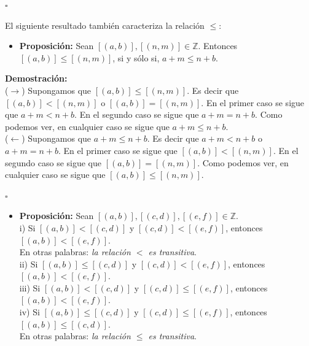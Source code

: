 \documentclass[10 pt]{article}
\begin{document}
\begin{flushright}
    $\square$
\end{flushright}

\Large{El siguiente resultado también caracteriza la relación $\leq$:} \\

\begin{itemize}
    \item \Large{\textbf{Proposición:} Sean $[(a,b)],[(n,m)] \in \mathbb Z$. Entonces $[(a,b)] \leq [(n,m)]$, si y sólo si, $a+m \leq n+b$.} \\
\end{itemize}

\Large{\textbf{Demostración:} \\

($\rightarrow$) Supongamos que $[(a,b)] \leq [(n,m)]$. Es decir que $[(a,b)]<[(n,m)]$ o $[(a,b)]=[(n,m)]$. En el primer caso se sigue que $a+m<n+b$. En el segundo caso se sigue que $a+m=n+b$. Como podemos ver, en cualquier caso se sigue que $a+m \leq n+b$. \\

($\leftarrow$) Supongamos que $a+m \leq n+b$. Es decir que $a+m<n+b$ o $a+m=n+b$. En el primer caso se sigue que $[(a,b)]<[(n,m)]$. En el segundo caso se sigue que $[(a,b)]=[(n,m)]$. Como podemos ver, en cualquier caso se sigue que $[(a,b)] \leq [(n,m)]$.} \\

\begin{flushright}
    $\square$
\end{flushright}

\begin{itemize}
    \item \Large{\textbf{Proposición:} Sean $[(a,b)],[(c,d)],[(e,f)] \in \mathbb Z$. \\

    i) Si $[(a,b)]<[(c,d)]$ y $[(c,d)]<[(e,f)]$, entonces $[(a,b)]<[(e,f)]$. \\

    En otras palabras: \textit{la relación $<$ es transitiva}. \\

    ii) Si $[(a,b)] \leq [(c,d)]$ y $[(c,d)]<[(e,f)]$, entonces $[(a,b)]<[(e,f)]$. \\

    iii) Si $[(a,b)]<[(c,d)]$ y $[(c,d)] \leq [(e,f)]$, entonces $[(a,b)]<[(e,f)]$. \\

    iv) Si $[(a,b)] \leq [(c,d)]$ y $[(c,d)] \leq [(e,f)]$, entonces $[(a,b)] \leq [(c,d)]$.\\

    En otras palabras: \textit{la relación $\leq$ es transitiva}.} \\
\end{itemize}
\end{document}

